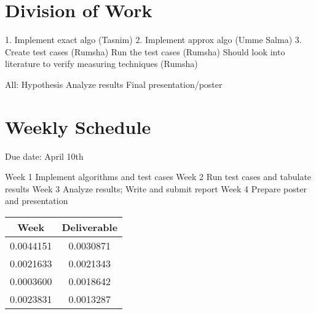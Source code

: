 \documentclass[letterpaper,12pt]{article}
\begin{document}
\section{Division of Work}

1. Implement exact algo (Tasnim)
2. Implement approx algo (Umme Salma)
3. Create test cases (Rumsha)
   Run the test cases (Rumsha)
   Should look into literature to verify measuring techniques (Rumsha)
   
 All: Hypothesis
      Analyze results
      Final presentation/poster      


\section{Weekly Schedule}
Due date: April 10th

Week 1 Implement algorithms and test cases
Week 2 Run test cases and tabulate results
Week 3 Analyze results; Write and submit report
Week 4 Prepare poster and presentation


\begin{table}[ht]
\begin{center}

\label{tbl:bins} %
\begin{tabular}{|cc|} 
\hline
\multicolumn{1}{|c}{\textbf{Week}} & \multicolumn{1}{c|}{\textbf{Deliverable}} \\
\hline
0.0044151 &   0.0030871 \\
0.0021633 &   0.0021343 \\
0.0003600 &   0.0018642 \\
0.0023831 &   0.0013287 \\
\hline
\end{tabular}
\end{center}
\end{table}
\end{document}
